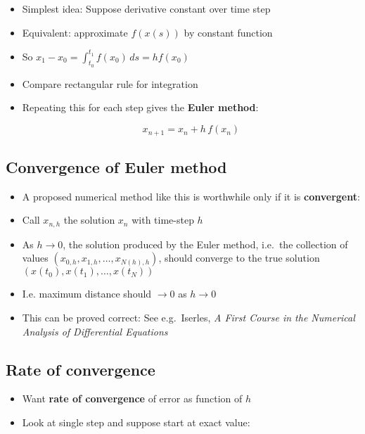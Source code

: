 \documentclass[
]{article}
\begin{document}
\begin{itemize}
\item
  Simplest idea: Suppose derivative constant over time step
\item
  Equivalent: approximate \(f(x(s))\) by constant function
\item
  So \(x_1 - x_0 = \int_{t_0}^{t_1} f(x_0) \, ds = h f(x_0)\)
\item
  Compare rectangular rule for integration
\item
  Repeating this for each step gives the \textbf{Euler method}:

  \[x_{n+1} = x_n + h \, f(x_n)\]
\end{itemize}

\hypertarget{convergence-of-euler-method}{%
\subsection{Convergence of Euler
method}\label{convergence-of-euler-method}}

\begin{itemize}
\item
  A proposed numerical method like this is worthwhile only if it is
  \textbf{convergent}:
\item
  Call \(x_{n, h}\) the solution \(x_n\) with time-step \(h\)
\item
  As \(h \to 0\), the solution produced by the Euler method, i.e.~the
  collection of values \((x_{0, h}, x_{1, h}, \ldots, x_{N(h), h})\),
  should converge to the true solution
  \((x(t_0), x(t_1), \ldots, x(t_N))\)
\item
  I.e. maximum distance should \(\to 0\) as \(h \to 0\)
\item
  This can be proved correct: See e.g.~Iserles, \emph{A First Course in
  the Numerical Analysis of Differential Equations}
\end{itemize}

\hypertarget{rate-of-convergence}{%
\subsection{Rate of convergence}\label{rate-of-convergence}}

\begin{itemize}
\item
  Want \textbf{rate of convergence} of error as function of \(h\)
\item
  Look at single step and suppose start at exact value:
\end{itemize}
\end{document}
